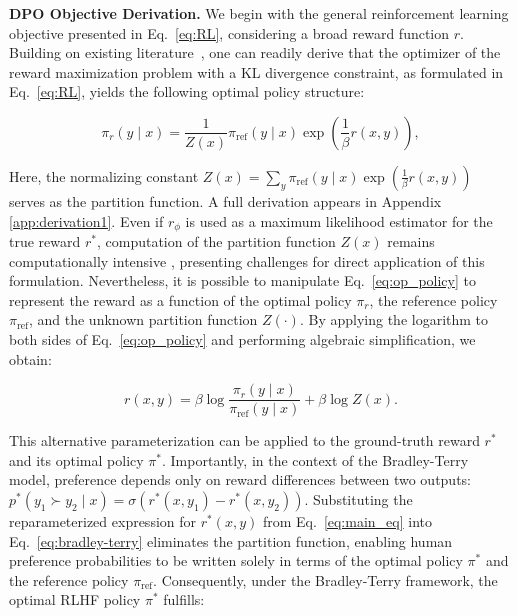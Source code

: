 \textbf{DPO Objective Derivation.} We begin with the general reinforcement learning objective presented in Eq.~\ref{eq:RL}, considering a broad reward function $r$. Building on existing literature~\citep{peters2007reinforcement, peng2019advantage, korbak2022reinforcement, go2023aligning}, one can readily derive that the optimizer of the reward maximization problem with a KL divergence constraint, as formulated in Eq.~\ref{eq:RL}, yields the following optimal policy structure:

\begin{equation}\label{eq:op_policy}
    \pi_r(y\mid x) = \frac{1}{Z(x)}\pi_\text{ref}(y\mid x)\exp\left(\frac{1}{\beta}r(x, y)\right),
\end{equation}

Here, the normalizing constant $Z(x) =\sum_{y}\pi_\text{ref}(y\mid x)\exp\left(\frac{1}{\beta}r(x, y)\right)$ serves as the partition function. A full derivation appears in Appendix \ref{app:derivation1}. Even if $r_{\phi}$ is used as a maximum likelihood estimator for the true reward $r^*$, computation of the partition function $Z(x)$ remains computationally intensive \citep{korbak2022reinforcement, go2023aligning}, presenting challenges for direct application of this formulation. Nevertheless, it is possible to manipulate Eq.~\ref{eq:op_policy} to represent the reward as a function of the optimal policy $\pi_r$, the reference policy $\pi_\text{ref}$, and the unknown partition function $Z(\cdot)$. By applying the logarithm to both sides of Eq.~\ref{eq:op_policy} and performing algebraic simplification, we obtain:

\begin{equation}\label{eq:main_eq}
    r(x,y) =\beta \log \frac{\pi_r(y\mid x)}{\pi_\text{ref}(y\mid x)} + \beta \log Z(x).
\end{equation}

This alternative parameterization can be applied to the ground-truth reward $r^*$ and its optimal policy $\pi^*$. Importantly, in the context of the Bradley-Terry model, preference depends only on reward differences between two outputs: ${p^*(y_1 \succ y_2 \mid x) = \sigma(r^*(x, y_1) - r^*(x, y_2))}$. Substituting the reparameterized expression for $r^*(x, y)$ from Eq.~\ref{eq:main_eq} into Eq.~\ref{eq:bradley-terry} eliminates the partition function, enabling human preference probabilities to be written solely in terms of the optimal policy $\pi^*$ and the reference policy $\pi_\text{ref}$. Consequently, under the Bradley-Terry framework, the optimal RLHF policy $\pi^*$ fulfills:

